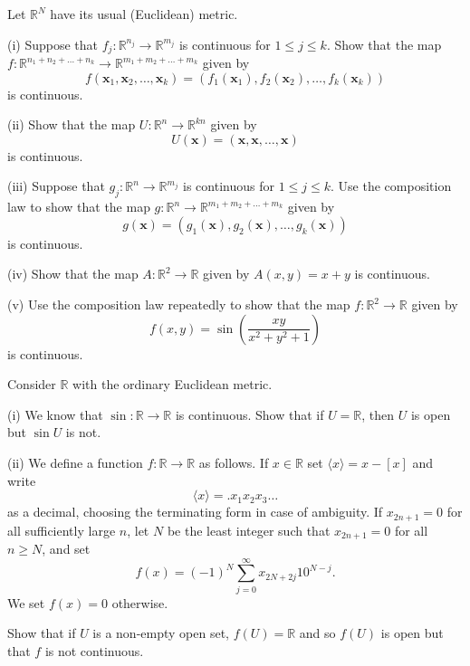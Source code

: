 \begin{problem}\label{E;extend composition}
Let ${\mathbb R}^{N}$ have its usual (Euclidean) metric.

(i) Suppose that $f_{j}:{\mathbb R}^{n_{j}}\rightarrow{\mathbb R}^{m_{j}}$
is continuous for $1\leq j\leq k$. Show that the map
$f:{\mathbb R}^{n_{1}+n_{2}+\dots+n_{k}}\rightarrow
{\mathbb R}^{m_{1}+m_{2}+\dots+m_{k}}$
given by
\[f({\mathbf x}_{1},{\mathbf x}_{2},\dots,{\mathbf x}_{k})
=(f_{1}({\mathbf x}_{1}),f_{2}({\mathbf x}_{2}),\dots,f_{k}({\mathbf x}_{k}))\]
is continuous.

(ii) Show that the map $U:{\mathbb R}^{n}\rightarrow{\mathbb R}^{kn}$
given by
\[U({\mathbf x})=({\mathbf x},{\mathbf x},\dots,{\mathbf x})\]
is continuous.

(iii)  Suppose that $g_{j}:{\mathbb R}^{n}\rightarrow{\mathbb R}^{m_{j}}$
is continuous for $1\leq j\leq k$.
Use the composition law to show that the map
$g:{\mathbb R}^{n}\rightarrow
{\mathbb R}^{m_{1}+m_{2}+\dots+m_{k}}$
given by
\[g({\mathbf x})
=(g_{1}({\mathbf x}),g_{2}({\mathbf x}),\dots,g_{k}({\mathbf x}))\]
is continuous.

(iv) Show that the map $A:{\mathbb R}^{2}\rightarrow{\mathbb R}$
given by $A(x,y)=x+y$ is continuous.

(v) Use the composition law repeatedly to show that the map
$f:{\mathbb R}^{2}\rightarrow{\mathbb R}$
given by
\[f(x,y)=\sin\left(\frac{xy}{x^{2}+y^{2}+1}\right)\]
is continuous.

\end{problem}
\begin{problem}\label{E;nasty discontinuous}
Consider ${\mathbb R}$ with the ordinary
Euclidean metric.

(i) We know that $\sin:{\mathbb R}\rightarrow{\mathbb R}$
is continuous. Show that if $U={\mathbb R}$, then $U$ is open but $\sin U$
is not.

(ii) We define a function $f:{\mathbb R}\rightarrow{\mathbb R}$ as follows.
If $x\in{\mathbb R}$ set $\langle x\rangle=x-[x]$ and write
\[\langle x\rangle=.x_{1}x_{2}x_{3}\dots\]
as a decimal, choosing the terminating form in case of ambiguity.
If $x_{2n+1}=0$ for all sufficiently large $n$, let $N$ be the
least integer such that $x_{2n+1}=0$ for all $n\geq N$, and set
\[f(x)=(-1)^{N}\sum_{j=0}^{\infty}x_{2N+2j}10^{N-j}.\]
We set $f(x)=0$ otherwise.

Show that if $U$ is a non-empty open set,
$f(U)={\mathbb R}$ and so $f(U)$ is open but that $f$ is not
continuous.
\end{problem}

